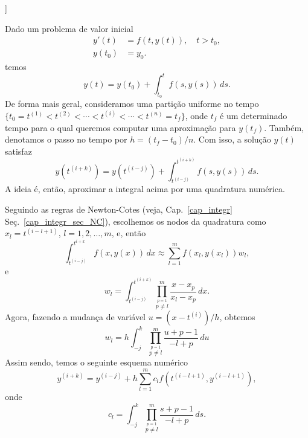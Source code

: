 \begin{flushleft}
  [[tag:revisar]]
\end{flushleft}

Dado um problema de valor inicial
\begin{align}
  y'(t) &= f(t,y(t)),\quad t>t_0,\\
  y(t_0) &= y_0.
\end{align}
temos
\begin{equation}
  y(t) = y(t_0) + \int_{t_0}^t f(s,y(s))\,ds.
\end{equation}
De forma mais geral, consideramos uma partição uniforme no tempo $\{t_0=t^{(1)} < t^{(2)} < \cdots < t^{(i)} < \cdots < t^{(n)}=t_f\}$, onde $t_f$ é um determinado tempo para o qual queremos computar uma aproximação para $y(t_f)$. Também, denotamos o passo no tempo por $h=(t_f-t_0)/n$. Com isso, a solução $y(t)$ satisfaz
\begin{equation}
  y\left(t^{(i+k)}\right) = y\left(t^{(i-j)}\right) + \int_{t^{(i-j)}}^{t^{(i+k)}} f(s,y(s))\,ds.
\end{equation}
A ideia é, então, aproximar a integral acima por uma quadratura numérica.

Seguindo as regras de Newton-Cotes (veja, Cap.~\ref{cap_integr} Seç.~\ref{cap_integr_sec_NC}), escolhemos os nodos da quadratura como $x_l = t^{(i-l+1)}$, $l = 1, 2, \dotsc, m$, e, então
\begin{equation}
  \int_{t^{(i-j)}}^{t^{i+k}} f(x,y(x))\,dx \approx \sum_{l=1}^{m} f\left(x_l,y(x_l)\right)w_l,
\end{equation}
e
\begin{equation}
  w_l = \int_{t^{(i-j)}}^{t^{(i+k)}} \prod_{\overset{p=1}{p\neq l}}^m \frac{x-x_p}{x_l-x_p}\,dx.
\end{equation}
Agora, fazendo a mudança de variável $u=(x-t^{(i)})/h$, obtemos
\begin{equation}
  w_l = h\int_{-j}^{k} \prod_{\overset{p=1}{p\neq l}}^m \frac{u+p-1}{-l+p}\,du
\end{equation}
Assim sendo, temos o seguinte esquema numérico
\begin{equation}
  y^{(i+k)} = y^{(i-j)} + h\sum_{l=1}^m c_{l}f(t^{(i-l+1)},y^{(i-l+1)}),\label{eq:mult_passo_iter}
\end{equation}
onde
\begin{equation}
  c_l = \int_{-j}^{k} \prod_{\overset{p=1}{p\neq l}}^m \frac{s+p-1}{-l+p}\,ds.\label{eq:mult_passo_pesos}
\end{equation}

